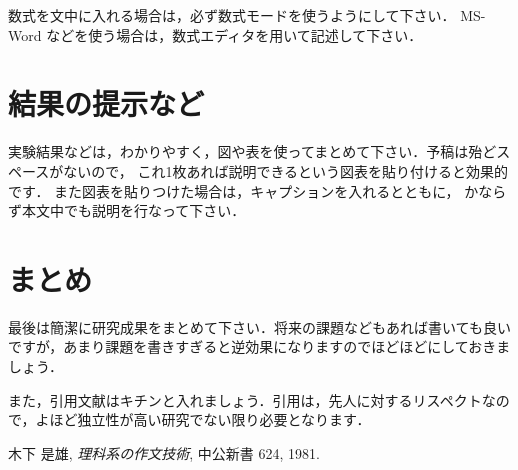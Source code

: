 \documentclass[twocolumn, a4paper, uplatex]{UECIEresume}
\begin{document}
数式を文中に入れる場合は，必ず数式モードを使うようにして下さい．
MS-Word などを使う場合は，数式エディタを用いて記述して下さい．


\section{結果の提示など}
実験結果などは，わかりやすく，図や表を使ってまとめて下さい．予稿は殆どスペースがないので，
これ1枚あれば説明できるという図表を貼り付けると効果的です．
また図表を貼りつけた場合は，キャプションを入れるとともに，
かならず本文中でも説明を行なって下さい．



\section{まとめ}
最後は簡潔に研究成果をまとめて下さい．将来の課題などもあれば書いても良いですが，あまり課題を書きすぎると逆効果になりますのでほどほどにしておきましょう．

また，引用文献はキチンと入れましょう\cite{Kinoshita1}．引用は，先人に対するリスペクトなので，よほど独立性が高い研究でない限り必要となります．

{\small
\begin{thebibliography}{*}
 木下 是雄, \textit{理科系の作文技術}, 中公新書 624, 1981.
\end{thebibliography}
}
\end{document}
